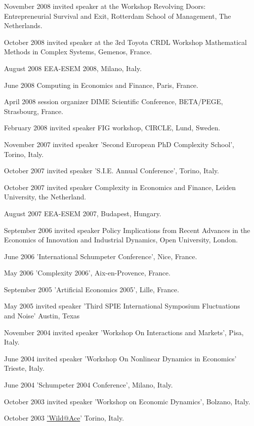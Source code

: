 \documentclass[a4paper]{article}
\begin{document}
November 2008 invited speaker at the Workshop \textquotedbl{}Revolving Doors:
Entrepreneurial Survival and Exit\textquotedbl{}, Rotterdam School of Management,
The Netherlands.

October 2008 invited speaker at the 3rd Toyota CRDL Workshop
\textquotedbl{}Mathematical Methods in Complex Systems\textquotedbl{}, Gemenos, France.

August 2008 EEA-ESEM 2008, Milano, Italy.

June 2008 \textquotedbl{}Computing in Economics and Finance\textquotedbl{}, Paris, France.

April 2008 session organizer \textquotedbl{}DIME Scientific Conference\textquotedbl{}, BETA/PEGE,
Strasbourg, France.

February 2008 invited speaker \textquotedbl{}FIG workshop\textquotedbl{}, CIRCLE, Lund, Sweden.

November 2007 invited speaker 'Second European PhD Complexity School',
Torino, Italy.

October 2007 invited speaker 'S.I.E. Annual Conference', Torino,
Italy.

October 2007 invited speaker \textquotedbl{}Complexity in Economics and Finance\textquotedbl{},
Leiden University, the Netherland.

August 2007  EEA-ESEM 2007, Budapest, Hungary.

September 2006 invited speaker \textquotedbl{}Policy Implications from Recent
Advances in the Economics of Innovation and Industrial Dynamics\textquotedbl{}, Open
University, London.

June 2006 'International Schumpeter Conference', Nice, France.

May 2006 'Complexity 2006', Aix-en-Provence, France.

September 2005 'Artificial Economics 2005', Lille, France.

May 2005 invited speaker 'Third SPIE International Symposium
Fluctuations and Noise' Austin, Texas

November 2004 invited speaker 'Workshop On Interactions and
Markets', Pisa, Italy.

June 2004 invited speaker 'Workshop On Nonlinear Dynamics in
Economics' Trieste, Italy.

June 2004 'Schumpeter 2004 Conference', Milano, Italy.

October 2003 invited speaker 'Workshop on Economic Dynamics',
Bolzano, Italy.

October 2003 \href{mailto:'Wild@Ace}{'Wild@Ace}' Torino, Italy.
\end{document}
